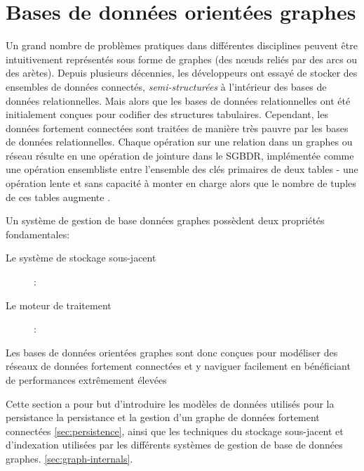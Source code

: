 \section{Bases de données orientées graphes}
\label{sec:graph-database-overview}
Un grand nombre de problèmes pratiques dans différentes disciplines
peuvent être intuitivement représentés sous forme de graphes (des
nœuds reliés par des arcs ou des arètes). Depuis plusieurs décennies,
les développeurs ont essayé de stocker des ensembles de données
connectés, \textit{semi-structurées} à l'intérieur des bases de
données relationnelles. Mais alors que les bases de données
relationnelles ont été initialement conçues pour codifier des
structures tabulaires. Cependant, les données fortement connectées
sont traitées de manière très pauvre par les bases de données
relationnelles. Chaque opération sur une relation dans un graphes ou
réseau résulte en une opération de jointure dans le \acrshort{SGBDR},
implémentée comme une opération ensembliste entre l'ensemble des clés
primaires de deux tables - une opération lente et sans capacité à
monter en charge alors que le nombre de tuples de ces tables augmente
\cite{robinson2013graph}.\medskip


Un système de gestion de base données graphes possèdent deux
propriétés fondamentales:

\begin{description}
\item [Le système de stockage sous-jacent]:
\item [Le moteur de traitement]:
\end{description}
\enddescription

\newpage
Les bases de données orientées graphes sont donc conçues pour
modéliser des réseaux de données fortement connectées et y naviguer
facilement en bénéficiant de performances extrêmement élevées\medskip



Cette section a pour but d'introduire les modèles de données utilisés
pour la persistance la persistance et la gestion d'un graphe de
données fortement connectées \ref{sec:persistence}, ainsi que les
techniques du stockage sous-jacent et d'indexation utilisées par les
différents systèmes de gestion de base de données graphes.
\ref{sec:graph-internals}.

